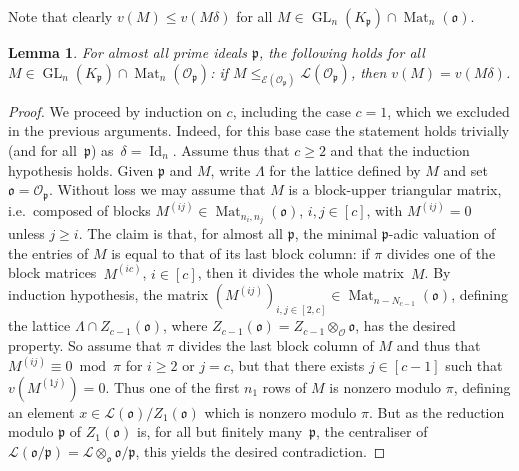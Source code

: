 \documentclass[11pt]{amsart}
\numberwithin{equation}{section}
\numberwithin{figure}{section}
\theoremstyle{plain}
\newtheorem{lemma}[theorem]{Lemma}
\theoremstyle{definition}
\theoremstyle{remark}
\begin{document}
Note that clearly $v(M) \leq v(M\delta)$ for all
$M\in\operatorname{GL}_n(K_{\mathfrak{p}})\cap \operatorname{Mat}_n({\mathfrak o})$.

\begin{lemma}\label{lem:delta}
  For almost all prime ideals ${\mathfrak{p}}$, the following holds for all
  $M\in\operatorname{GL}_n(K_{\mathfrak{p}}) \cap \operatorname{Mat}_n({\ensuremath{\mathcal{O}}}_{\mathfrak{p}})$: if $M
  \leq_{{\mathcal{E}}({\ensuremath{\mathcal{O}}}_{\mathfrak{p}})}{\ensuremath{\mathcal{L}}}({\ensuremath{\mathcal{O}}}_{\mathfrak{p}})$, then $v(M) =
  v(M\delta)$.
\end{lemma}

\begin{proof} We proceed by induction on $c$, including the case $c=1$, which we
excluded in the previous arguments. Indeed, for this base case the
statement holds trivially (and for all~${\mathfrak{p}}$) as~$\delta =
\operatorname{Id}_n$. Assume thus that $c\geq 2$ and that the induction hypothesis
holds. Given ${\mathfrak{p}}$ and $M$, write $\Lambda$ for the lattice defined
by $M$ and set ${\mathfrak o} = {\ensuremath{\mathcal{O}}}_{\mathfrak{p}}$. Without loss we may assume that
$M$ is a block-upper triangular matrix, i.e.\ composed of blocks
$M^{(ij)}\in\operatorname{Mat}_{n_i, n_j}({\mathfrak o})$, $i,j\in[c]$, with $M^{(ij)} = 0$
unless $j\geq i$. The claim is that, for almost all ${\mathfrak{p}}$, the
minimal ${\mathfrak{p}}$-adic valuation of the entries of $M$ is equal to that
of its last block column: if $\pi$ divides one of the block
matrices~$M^{(ic)}$, $i\in[c]$, then it divides the whole
matrix~$M$. By induction hypothesis, the matrix
$(M^{(ij)})_{i,j\in[2,c]}\in\operatorname{Mat}_{n-N_{c-1}}({\mathfrak o})$, defining the
lattice $\Lambda \cap Z_{c-1}({\mathfrak o})$, where $Z_{c-1}({\mathfrak o}) =
Z_{c-1}\otimes_{\ensuremath{\mathcal{O}}}{\mathfrak o}$, has the desired property. So assume that
$\pi$ divides the last block column of $M$ and thus that
$M^{(ij)}\equiv 0 \bmod \pi$ for $i\geq 2$ or $j=c$, but that there
exists $j\in[c-1]$ such that~$v(M^{(1j)})=0$. Thus one of the first
$n_1$ rows of $M$ is nonzero modulo $\pi$, defining an element $x\in
{\ensuremath{\mathcal{L}}}({\mathfrak o})/Z_{1}({\mathfrak o})$ which is nonzero modulo $\pi$. But as the
reduction modulo ${\mathfrak{p}}$ of $Z_1({\mathfrak o})$ is, for all but finitely
many~${\mathfrak{p}}$, the centraliser of ${\ensuremath{\mathcal{L}}}({\mathfrak o}/{\mathfrak{p}}) = {\ensuremath{\mathcal{L}}} \otimes_{\mathfrak o}
{\mathfrak o}/{\mathfrak{p}}$, this yields the desired contradiction.  \end{proof}
\end{document}
